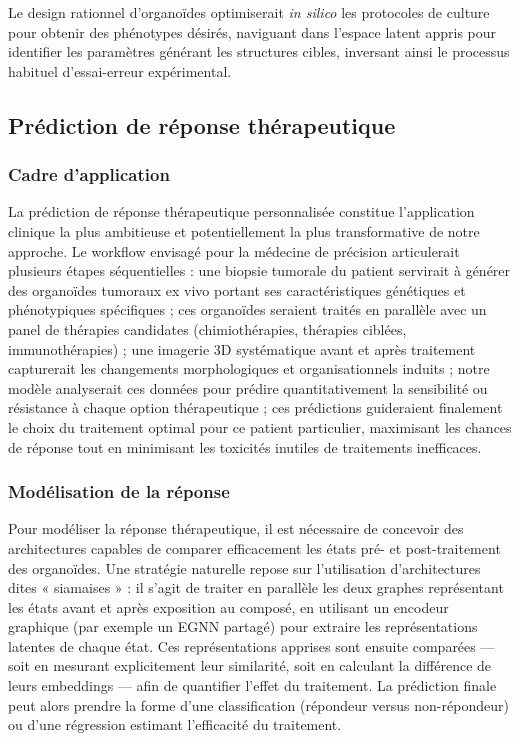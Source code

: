 Le design rationnel d'organoïdes optimiserait \textit{in silico} les protocoles de culture pour obtenir des phénotypes désirés, naviguant dans l'espace latent appris pour identifier les paramètres générant les structures cibles, inversant ainsi le processus habituel d'essai-erreur expérimental.

\subsection{Prédiction de réponse thérapeutique}

\subsubsection{Cadre d'application}

La prédiction de réponse thérapeutique personnalisée constitue l'application clinique la plus ambitieuse et potentiellement la plus transformative de notre approche. Le workflow envisagé pour la médecine de précision articulerait plusieurs étapes séquentielles : une biopsie tumorale du patient servirait à générer des organoïdes tumoraux ex vivo portant ses caractéristiques génétiques et phénotypiques spécifiques ; ces organoïdes seraient traités en parallèle avec un panel de thérapies candidates (chimiothérapies, thérapies ciblées, immunothérapies) ; une imagerie 3D systématique avant et après traitement capturerait les changements morphologiques et organisationnels induits ; notre modèle analyserait ces données pour prédire quantitativement la sensibilité ou résistance à chaque option thérapeutique ; ces prédictions guideraient finalement le choix du traitement optimal pour ce patient particulier, maximisant les chances de réponse tout en minimisant les toxicités inutiles de traitements inefficaces.

\subsubsection{Modélisation de la réponse}

Pour modéliser la réponse thérapeutique, il est nécessaire de concevoir des architectures capables de comparer efficacement les états pré- et post-traitement des organoïdes. Une stratégie naturelle repose sur l’utilisation d’architectures dites « siamaises » : il s’agit de traiter en parallèle les deux graphes représentant les états avant et après exposition au composé, en utilisant un encodeur graphique (par exemple un EGNN partagé) pour extraire les représentations latentes de chaque état. Ces représentations apprises sont ensuite comparées — soit en mesurant explicitement leur similarité, soit en calculant la différence de leurs embeddings — afin de quantifier l’effet du traitement. La prédiction finale peut alors prendre la forme d’une classification (répondeur versus non-répondeur) ou d’une régression estimant l’efficacité du traitement.

